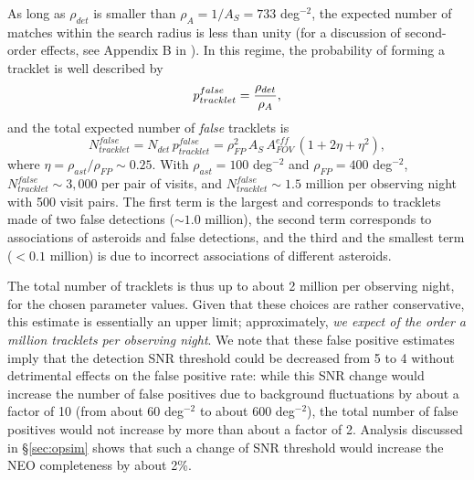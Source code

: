 As long as $\rho_{det}$ is smaller than $\rho_A = 1/A_S = 733$ deg$^{-2}$, the expected number of 
matches within the search radius is less than unity (for a discussion of second-order effects, see Appendix B 
in \citealt{IVLZ2005}). In this regime, the probability of forming a tracklet is well described by 
\begin{equation}
                 p_{tracklet}^{false} =   { \rho_{det}  \over \rho_A}, 
\end{equation}
and the total expected number of {\it false} tracklets is 
\begin{equation}
           N_{tracklet}^{false} = N_{det} \, p_{tracklet}^{false} =  \rho^2_{FP}  \, A_S \, A_{FOV}^{eff} \,
                                \left(1 + 2 \eta + \eta^2\right),
\end{equation}
where $\eta = \rho_{ast}  / \rho_{FP} \sim 0.25$. With $\rho_{ast} = 100$ deg$^{-2}$ and  $\rho_{FP} = 400$ deg$^{-2}$, 
$N_{tracklet}^{false} \sim 3,000$ per pair of visits, and $N_{tracklet}^{false} \sim 1.5$ million per observing night with 
500 visit pairs. The first term is the largest and corresponds to tracklets made of two false detections ($\sim1.0$ million), 
the second term corresponds to associations of asteroids and false detections, and the third and the smallest term 
($<0.1$ million) is due to incorrect associations of different asteroids.

The total number of tracklets is thus up to about 2 million per observing night, for the chosen parameter 
values. Given that these choices are rather conservative, this estimate is essentially an upper limit; approximately, 
{\it we expect of the order a million tracklets per observing night}. We note that these false positive estimates imply that
the detection SNR threshold could be decreased from 5 to 4 without detrimental effects on the false positive rate:
while this SNR change would increase the number of false positives due to background fluctuations by about a factor of 10
(from about 60 deg$^{-2}$ to about 600 deg$^{-2}$), the total number of false positives would not increase by more
than about a  factor of 2.  Analysis discussed in \S\ref{sec:opsim} shows that such a change of SNR threshold would increase 
the NEO completeness by  about 2\%. 

